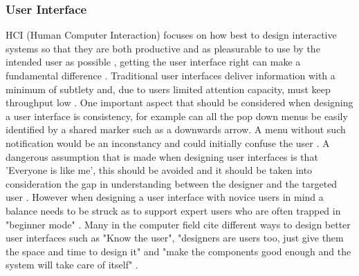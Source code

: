 \documentclass[12pt,a4paper]{article}
\begin{document}
\subsubsection{User Interface} 
HCI (Human Computer Interaction) focuses on how best to design interactive systems so that they are both productive and as pleasurable to use by the intended user as possible \cite{smith2006human}, getting the user interface right can make a fundamental difference \cite{ritter2014foundations1}. Traditional user interfaces deliver information with a minimum of subtlety and, due to users limited attention capacity, must keep throughput low \cite{bulling2016pervasive}.  One important aspect that should be considered when designing a user interface is consistency, for example can all the pop down menus be easily identified by a shared marker such as a downwards arrow. A menu without such notification would be an inconstancy and could initially confuse the user \cite{nielsen2014coordinating}. A dangerous assumption that is made when designing user interfaces is that 'Everyone is like me', this should be avoided and it should be taken into consideration the gap in understanding between the designer and the targeted user \cite{ritter2014foundations2}. However when designing a user interface with novice users in mind a balance needs to be struck as to support expert users who are often trapped in "beginner mode" \cite{cockburn2015supporting}. Many in the computer field cite different ways to design better user interfaces such as "Know the user", "designers are users too, just give them the space and time to design it" and "make the components good enough and the system will take care of itself" \cite{card2017psychology}.
\end{document}
